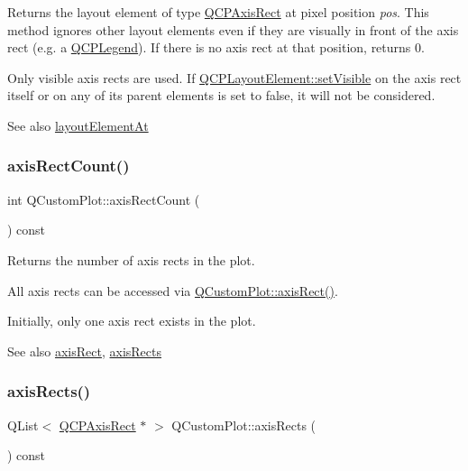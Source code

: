 Returns the layout element of type \hyperlink{class_q_c_p_axis_rect}{Q\+C\+P\+Axis\+Rect} at pixel position {\itshape pos}. This method ignores other layout elements even if they are visually in front of the axis rect (e.\+g. a \hyperlink{class_q_c_p_legend}{Q\+C\+P\+Legend}). If there is no axis rect at that position, returns 0.

Only visible axis rects are used. If \hyperlink{class_q_c_p_layerable_a3bed99ddc396b48ce3ebfdc0418744f8}{Q\+C\+P\+Layout\+Element\+::set\+Visible} on the axis rect itself or on any of its parent elements is set to false, it will not be considered.

\begin{DoxySeeAlso}{See also}
\hyperlink{class_q_custom_plot_afaa1d304e0287d140fd238e90889ef3c}{layout\+Element\+At} 
\end{DoxySeeAlso}
\mbox{\label{class_q_custom_plot_a8f85940aaac50efb466287d9d2d04ec6}} 
\subsubsection{\texorpdfstring{axis\+Rect\+Count()}{axisRectCount()}}
{\footnotesize\ttfamily int Q\+Custom\+Plot\+::axis\+Rect\+Count (\begin{DoxyParamCaption}{ }\end{DoxyParamCaption}) const}

Returns the number of axis rects in the plot.

All axis rects can be accessed via \hyperlink{class_q_custom_plot_ae5eefcb5f6ca26689b1fd4f6e25b42f9}{Q\+Custom\+Plot\+::axis\+Rect()}.

Initially, only one axis rect exists in the plot.

\begin{DoxySeeAlso}{See also}
\hyperlink{class_q_custom_plot_ae5eefcb5f6ca26689b1fd4f6e25b42f9}{axis\+Rect}, \hyperlink{class_q_custom_plot_a12af771429e2d7e313c8c5d5fca068fe}{axis\+Rects} 
\end{DoxySeeAlso}
\mbox{\label{class_q_custom_plot_a12af771429e2d7e313c8c5d5fca068fe}} 
\subsubsection{\texorpdfstring{axis\+Rects()}{axisRects()}}
{\footnotesize\ttfamily Q\+List$<$ \hyperlink{class_q_c_p_axis_rect}{Q\+C\+P\+Axis\+Rect} $\ast$ $>$ Q\+Custom\+Plot\+::axis\+Rects (\begin{DoxyParamCaption}{ }\end{DoxyParamCaption}) const}

